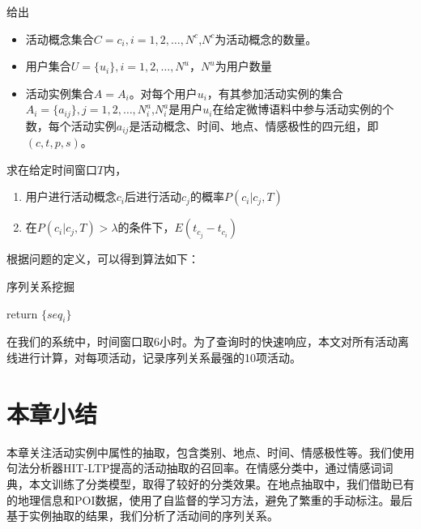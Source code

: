 \begin{problem}[序列关系挖掘]
给出
\begin{itemize}
\item 活动概念集合$C={c_i},i=1,2,\ldots,N^c$,$N^c$为活动概念的数量。
\item 用户集合$U=\{u_i\},i=1,2,\ldots,N^u$，$N^u$为用户数量
\item 活动实例集合$A = {A_i}$。对每个用户$u_i$，有其参加活动实例的集合$A_i = \{a_{ij}\}, j=1,2,\ldots,N_i^a$,$N_i^a$是用户$u_i$在给定微博语料中参与活动实例的个数，每个活动实例$a_{ij}$是活动概念、时间、地点、情感极性的四元组，即$(c,t,p,s)$。
\end{itemize}
求在给定时间窗口$T$内，
\begin{enumerate}
\item 用户进行活动概念$c_i$后进行活动$c_j$的概率$P(c_i|c_j,T)$
\item 在$P(c_i|c_j,T)>\lambda$的条件下，$E(t_{c_j} - t_{c_i})$
\end{enumerate}
\end{problem}

根据问题的定义，可以得到算法如下：

\begin{algorithm}
  \caption{序列关系挖掘}

  return $\{seq_i\}$
\end{algorithm}

在我们的系统中，时间窗口取6小时。为了查询时的快速响应，本文对所有活动离线进行计算，对每项活动，记录序列关系最强的10项活动。

\section{本章小结}
本章关注活动实例中属性的抽取，包含类别、地点、时间、情感极性等。我们使用句法分析器HIT-LTP提高的活动抽取的召回率。在情感分类中，通过情感词词典，本文训练了分类模型，取得了较好的分类效果。在地点抽取中，我们借助已有的地理信息和POI数据，使用了自监督的学习方法，避免了繁重的手动标注。最后基于实例抽取的结果，我们分析了活动间的序列关系。

